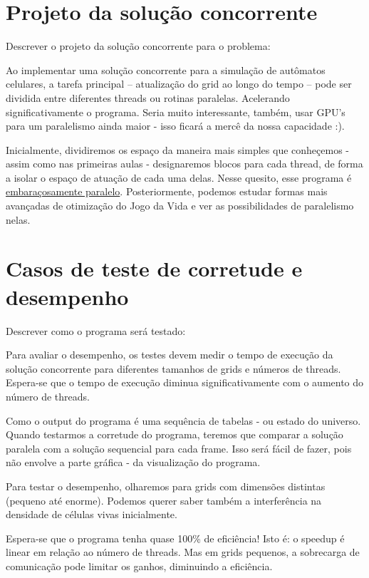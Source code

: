 \documentclass[14]{article}
\begin{document}
\section{Projeto da solução concorrente}
{Descrever o projeto da solução concorrente para o problema: 

Ao implementar uma solução concorrente para a simulação de autômatos celulares, a tarefa principal – 
atualização do grid ao longo do tempo – pode ser dividida entre diferentes threads ou rotinas paralelas.
Acelerando significativamente o programa. Seria muito interessante, também, usar GPU's para um paralelismo
ainda maior - isso ficará a mercê da nossa capacidade :).

Inicialmente, dividiremos os espaço da maneira mais simples que conheçemos - assim como nas primeiras aulas - designaremos
blocos para cada thread, de forma a isolar o espaço de atuação de cada uma delas. Nesse quesito, esse programa é 
\href{https://en.wikipedia.org/wiki/Embarrassingly_parallel}{embaraçosamente paralelo}.
Posteriormente, podemos estudar formas mais avançadas de otimização do Jogo da Vida e ver as possibilidades de paralelismo nelas.

\section{Casos de teste de corretude e desempenho}
{Descrever como o programa será testado:

Para avaliar o desempenho, os testes devem medir o tempo de execução da solução concorrente para diferentes tamanhos de grids 
e números de threads. Espera-se que o tempo de execução diminua  significativamente com o aumento do número de threads.

Como o output do programa é uma sequência de tabelas - ou estado do universo. Quando testarmos a corretude do programa,
teremos que comparar a solução paralela com a solução sequencial para cada frame. Isso será fácil de fazer, pois não envolve
a parte gráfica - da visualização do programa.

Para testar o desempenho, olharemos para grids com dimensões distintas (pequeno até enorme).
Podemos querer saber também a interferência na densidade de células vivas inicialmente.

Espera-se que o programa tenha quase 100\% de eficiência! Isto é: o speedup é linear em relação ao número de threads.
Mas em grids pequenos, a sobrecarga de comunicação pode limitar os ganhos, diminuindo a eficiência.

}}
\end{document}
